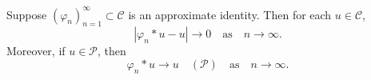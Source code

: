 Suppose $(\varphi_n)_{n=1}^{\infty} \subset \mathcal{C}$ is an approximate identity. Then for each $u \in \mathcal{C}$,
$$|\varphi_n * u - u| \to 0 \quad \text{as} \quad n \to \infty.$$
Moreover, if $u \in \mathcal{P}$, then
$$\varphi_n * u \to u \quad (\mathcal{P}) \quad \text{as} \quad n \to \infty.$$
